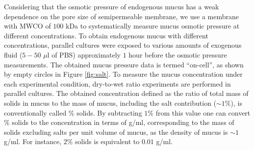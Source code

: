 \documentclass[8.5pt,twoside,twocolumn]{article}
\begin{document}
Considering that the osmotic pressure of endogenous mucus has a weak
dependence on the pore size of semipermeable membrane, we use a membrane
with MWCO of $100$ kDa to systematically measure mucus osmotic pressure at
different concentrations. To obtain endogenous mucus with different
concentrations, parallel cultures were exposed to various amounts of
exogenous fluid ($5-50$ $\mu $l of PBS) approximately $1$ hour before the
osmotic pressure measurements. The obtained mucus pressure data is termed
\textquotedblleft on-cell\textquotedblright , as shown by empty circles in
Figure \ref{fig:salt}. To measure the mucus concentration under each
experimental condition, dry-to-wet ratio experiments \cite{Tarran2004} are
performed in parallel cultures. The obtained concentration defined as the
ratio of total mass of solids in mucus to the mass of mucus, including the
salt contribution ($\sim 1\%$), is conventionally called $\%$ solids. By
subtracting $1\%$ from this value one can convert $\%$ solids to the
concentration in terms of g/ml, corresponding to the mass of solids
excluding salts per unit volume of mucus, as the density of mucus is $\sim 1$
g/ml. For instance, $2\%$ solids is equivalent to $0.01$ g/ml.
\end{document}
